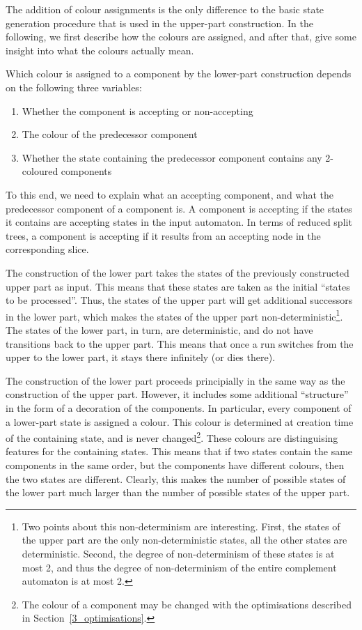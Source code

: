The addition of colour assignments is the only difference to the basic state generation procedure that is used in the upper-part construction. In the following, we first describe how the colours are assigned, and after that, give some insight into what the colours actually mean.

Which colour is assigned to a component by the lower-part construction depends on the following three variables:
\begin{enumerate}
\item Whether the component is accepting or non-accepting
\item The colour of the predecessor component
\item Whether the state containing the predecessor component contains any 2-coloured components
\end{enumerate}

To this end, we need to explain what an accepting component, and what the predecessor component of a component is. A component is accepting if the states it contains are accepting states in the input automaton. In terms of reduced split trees, a component is accepting if it results from an accepting node in the corresponding slice. 



The construction of the lower part takes the states of the previously constructed upper part as input. This means that these states are taken as the initial ``states to be processed''. Thus, the states of the upper part will get additional successors in the lower part, which makes the states of the upper part non-deterministic\footnote{Two points about this non-determinism are interesting. First, the states of the upper part are the only non-deterministic states, all the other states are deterministic. Second, the degree of non-determinism of these states is at most 2, and thus the degree of non-determinism of the entire complement automaton is at most 2.}. The states of the lower part, in turn, are deterministic, and do not have transitions back to the upper part. This means that once a run switches from the upper to the lower part, it stays there infinitely (or dies there). 

The construction of the lower part proceeds principially in the same way as the construction of the upper part. However, it includes some additional ``structure'' in the form of a decoration of the components. In particular, every component of a lower-part state is assigned a colour. This colour is determined at creation time of the containing state, and is never changed\footnote{The colour of a component may be changed with the optimisations described in Section~\ref{3_optimisations}.}. These colours are distinguising features for the containing states. This means that if two states contain the same components in the same order, but the components have different colours, then the two states are different. Clearly, this makes the number of possible states of the lower part much larger than the number of possible states of the upper part.


